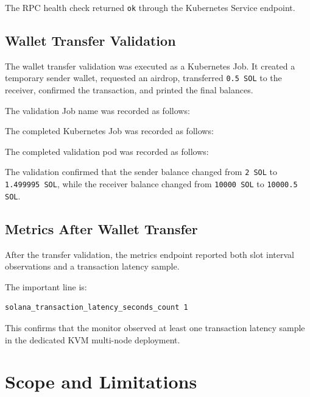\documentclass[11pt,a4paper]{article}
\begin{document}
The RPC health check returned \texttt{ok} through the Kubernetes Service endpoint.



\subsection{Wallet Transfer Validation}

The wallet transfer validation was executed as a Kubernetes Job. It created a temporary sender wallet, requested an airdrop, transferred \texttt{0.5 SOL} to the receiver, confirmed the transaction, and printed the final balances.

The validation Job name was recorded as follows:



The completed Kubernetes Job was recorded as follows:



The completed validation pod was recorded as follows:



The validation confirmed that the sender balance changed from \texttt{2 SOL} to \texttt{1.499995 SOL}, while the receiver balance changed from \texttt{10000 SOL} to \texttt{10000.5 SOL}.

\subsection{Metrics After Wallet Transfer}

After the transfer validation, the metrics endpoint reported both slot interval observations and a transaction latency sample.



The important line is:

\begin{lstlisting}
solana_transaction_latency_seconds_count 1
\end{lstlisting}

This confirms that the monitor observed at least one transaction latency sample in the dedicated KVM multi-node deployment.

\section{Scope and Limitations}
\end{document}
